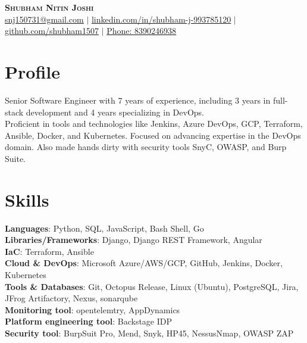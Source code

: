 \documentclass[letterpaper, 11pt]{article}
\begin{document}
\begin{center}
    \textbf{\Huge \scshape Shubham Nitin Joshi} \\
    \href{mailto:shubham.joshi1507@gmail.com}{\underline{snj150731@gmail.com}} $|$ 
    \href{https://www.linkedin.com/in/shubham-j-993785120/}{\underline{linkedin.com/in/shubham-j-993785120}} $|$
    \href{https://github.com/shubham1507}{\underline{github.com/shubham1507}} $|$
    \href{tel:8390246938}{\underline{Phone: 8390246938}}
\end{center}

\vspace{-15pt}

\section{Profile}
\small{
    Senior Software Engineer with 7 years of experience, including 3 years in full-stack development and 4 years specializing in DevOps. \\
    Proficient in tools and technologies like Jenkins, Azure DevOps, GCP, Terraform, Ansible, Docker, and Kubernetes. Focused on advancing expertise in the DevOps domain. 
    Also made hands dirty with security tools SnyC, OWASP, and Burp Suite. \\
}

\vspace{-15pt}

\section{Skills}
\begin{itemize}[leftmargin=0.25in, label={}]
    \small{\item{
     \textbf{Languages}{: Python, SQL, JavaScript, Bash Shell, Go} \\
     \textbf{Libraries/Frameworks}{: Django, Django REST Framework, Angular} \\
     \textbf{IaC}{: Terraform, Ansible} \\
     \textbf{Cloud \& DevOps}{: Microsoft Azure/AWS/GCP, GitHub, Jenkins, Docker, Kubernetes} \\
     \textbf{Tools \& Databases}{: Git, Octopus Release, Linux (Ubuntu), PostgreSQL, Jira, JFrog Artifactory, Nexus, sonarqube} \\
     \textbf{Monitoring tool}{: opentelemtry, AppDynamics} \\
     \textbf{Platform engineering tool}{: Backstage IDP } \\
     \textbf{Security tool}{: BurpSuit Pro, Mend, Snyk, HP45, NessusNmap, OWASP ZAP} \\
    }}\\
\end{itemize}
\end{document}
